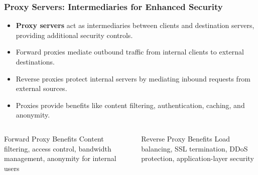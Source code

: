 \documentclass{beamer}
\begin{document}
\begin{frame}
    \frametitle{Proxy Servers: Intermediaries for Enhanced Security}
    \begin{itemize}
        \item \textbf{Proxy servers} act as intermediaries between clients and destination servers, providing additional security controls.
        \item Forward proxies mediate outbound traffic from internal clients to external destinations.
        \item Reverse proxies protect internal servers by mediating inbound requests from external sources.
        \item Proxies provide benefits like content filtering, authentication, caching, and anonymity.
    \end{itemize}
    
    \begin{columns}
        \begin{column}{0.48\textwidth}
            \begin{block}{Forward Proxy Benefits}
                Content filtering, access control, bandwidth management, anonymity for internal users
            \end{block}
        \end{column}
        \begin{column}{0.48\textwidth}
            \begin{block}{Reverse Proxy Benefits}
                Load balancing, SSL termination, DDoS protection, application-layer security
            \end{block}
        \end{column}
    \end{columns}
\end{frame}
\end{document}
